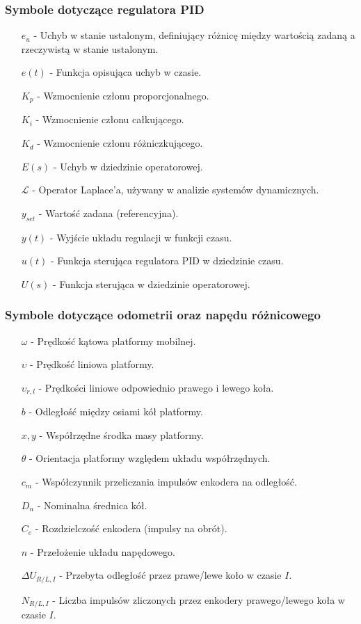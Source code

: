 \subsubsection*{Symbole dotyczące regulatora PID}

\begin{itemize}
    \item[\(e_u\)] - Uchyb w stanie ustalonym, definiujący różnicę między wartością zadaną a rzeczywistą w stanie ustalonym.
    \item[\(e(t)\)] - Funkcja opisująca uchyb w czasie.
    \item[\(K_p\)] - Wzmocnienie członu proporcjonalnego.
    \item[\(K_i\)] - Wzmocnienie członu całkującego.
    \item[\(K_d\)] - Wzmocnienie członu różniczkującego.
    \item[\(E(s)\)] - Uchyb w dziedzinie operatorowej.
    \item[\(\mathcal{L}\)] - Operator Laplace’a, używany w analizie systemów dynamicznych.
    \item[\(y_{set}\)] - Wartość zadana (referencyjna).
    \item[\(y(t)\)] - Wyjście układu regulacji w funkcji czasu.
    \item[\(u(t)\)] - Funkcja sterująca regulatora PID w dziedzinie czasu.
    \item[\(U(s)\)] - Funkcja sterująca w dziedzinie operatorowej.
\end{itemize}

\subsubsection*{Symbole dotyczące odometrii oraz napędu różnicowego}

\begin{itemize}
    \item[\(\omega\)] - Prędkość kątowa platformy mobilnej.
    \item[\(\upsilon\)] - Prędkość liniowa platformy.
    \item[\(\upsilon_{r, l}\)] - Prędkości liniowe odpowiednio prawego i lewego koła.
    \item[\(b\)] - Odległość między osiami kół platformy.
    \item[\(x , y\)]  - Współrzędne środka masy platformy.
    \item[\(\theta\)]  - Orientacja platformy względem układu współrzędnych.
    \item[\(c_m\)] - Współczynnik przeliczania impulsów enkodera na odległość.
    \item[\(D_n\)] - Nominalna średnica kół.
    \item[\(C_e\)] - Rozdzielczość enkodera (impulsy na obrót).
    \item[\(n\)] - Przełożenie układu napędowego.
    \item[\(\Delta U_{R/L, I}\)] - Przebyta odległość przez prawe/lewe koło w czasie \(I\).
    \item[\(N_{R/L, I}\)] - Liczba impulsów zliczonych przez enkodery prawego/lewego koła w czasie \(I\).
\end{itemize}

